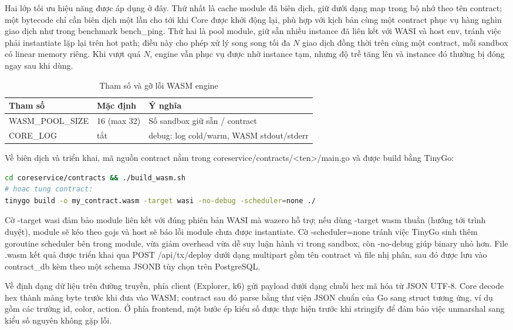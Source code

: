Hai lớp tối ưu hiệu năng được áp dụng ở đây. Thứ nhất là cache module đã biên
dịch, giữ dưới dạng map trong bộ nhớ theo tên contract; một bytecode chỉ cần
biên dịch một lần cho tới khi Core được khởi động lại, phù hợp với kịch bản
cùng một contract phục vụ hàng nghìn giao dịch như trong benchmark
bench\_ping. Thứ hai là pool module, giữ sẵn nhiều instance đã liên
kết với WASI và host env, tránh việc phải instantiate lặp lại trên hot
path; điều này cho phép xử lý song song tối đa $N$ giao dịch đồng thời trên
cùng một contract, mỗi sandbox có linear memory riêng. Khi vượt quá $N$, engine
vẫn phục vụ được nhờ instance tạm, nhưng độ trễ tăng lên và instance đó thường
bị đóng ngay sau khi dùng.

\begin{table}[H]
\centering
\caption{Tham số và gỡ lỗi WASM engine}
\label{tab:wasm-env}
\begin{tabular}{@{}p{3.4cm}p{2.4cm}p{5.8cm}@{}}
\toprule
Tham số & Mặc định & Ý nghĩa \\
\midrule
WASM\_POOL\_SIZE & 16 (max 32) & Số sandbox giữ sẵn / contract \\
CORE\_LOG & tắt & debug: log cold/warm, WASM stdout/stderr \\
\bottomrule
\end{tabular}
\end{table}

Về biên dịch và triển khai, mã nguồn contract nằm trong
coreservice/contracts/<ten>/main.go và được build bằng TinyGo:

\begin{lstlisting}[language=bash,numbers=none,caption={Bien dich WASM (TinyGo)},captionpos=b]
cd coreservice/contracts && ./build_wasm.sh
# hoac tung contract:
tinygo build -o my_contract.wasm -target wasi -no-debug -scheduler=none ./
\end{lstlisting}

Cờ -target wasi đảm bảo module liên kết với đúng phiên bản WASI mà
wazero hỗ trợ; nếu dùng -target wasm thuần (hướng tới trình duyệt),
module sẽ kéo theo gojs và host sẽ báo lỗi module chưa được
instantiate. Cờ -scheduler=none tránh việc TinyGo sinh thêm goroutine
scheduler bên trong module, vừa giảm overhead vừa dễ suy luận hành vi trong
sandbox, còn -no-debug giúp binary nhỏ hơn. File .wasm kết
quả được triển khai qua POST /api/tx/deploy dưới dạng multipart gồm
tên contract và file nhị phân, sau đó được lưu vào contract\_db kèm
theo một schema JSONB tùy chọn trên PostgreSQL.

Về định dạng dữ liệu trên đường truyền, phía client (Explorer, k6) gửi payload
dưới dạng chuỗi hex mã hóa từ JSON UTF-8. Core decode hex thành mảng byte trước
khi đưa vào WASM; contract sau đó parse bằng thư viện JSON chuẩn của Go sang
struct tương ứng, ví dụ gồm các trường id, color,
action. Ở phía frontend, một bước ép kiểu số được thực hiện trước khi
stringify để đảm bảo việc unmarshal sang kiểu số nguyên không gặp lỗi.

